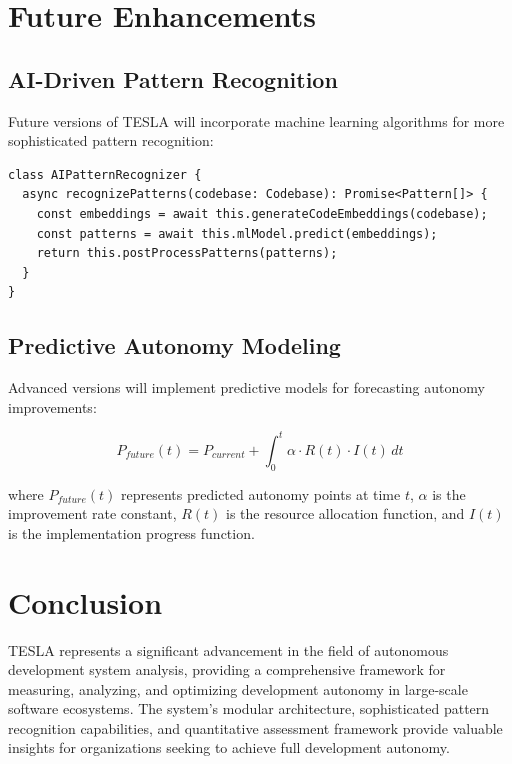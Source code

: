 \documentclass[10pt]{article}
\begin{document}
\section{Future Enhancements}

\subsection{AI-Driven Pattern Recognition}

Future versions of TESLA will incorporate machine learning algorithms for more sophisticated pattern recognition:

\begin{lstlisting}[caption={AI-Enhanced Pattern Recognition}]
class AIPatternRecognizer {
  async recognizePatterns(codebase: Codebase): Promise<Pattern[]> {
    const embeddings = await this.generateCodeEmbeddings(codebase);
    const patterns = await this.mlModel.predict(embeddings);
    return this.postProcessPatterns(patterns);
  }
}
\end{lstlisting}

\subsection{Predictive Autonomy Modeling}

Advanced versions will implement predictive models for forecasting autonomy improvements:

\begin{equation}
P_{future}(t) = P_{current} + \int_0^t \alpha \cdot R(t) \cdot I(t) \, dt
\end{equation}

where $P_{future}(t)$ represents predicted autonomy points at time $t$, $\alpha$ is the improvement rate constant, $R(t)$ is the resource allocation function, and $I(t)$ is the implementation progress function.

\section{Conclusion}

TESLA represents a significant advancement in the field of autonomous development system analysis, providing a comprehensive framework for measuring, analyzing, and optimizing development autonomy in large-scale software ecosystems. The system's modular architecture, sophisticated pattern recognition capabilities, and quantitative assessment framework provide valuable insights for organizations seeking to achieve full development autonomy.
\end{document}
